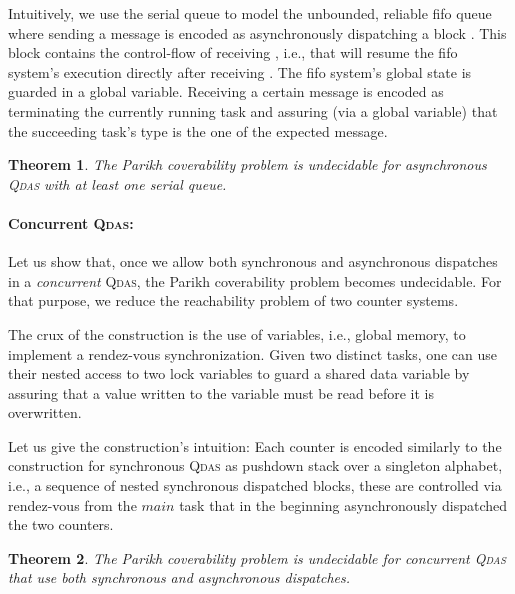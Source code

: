 \documentclass[runningheads,oribibl,]{article}
\newcommand{\main}{\ensuremath{\textit{main}}\xspace}
\newcommand{\qdas}{\textsc{Qdas}\xspace}
\newcommand{\fifo}{fifo\xspace}
\newtheorem{theorem}{Theorem}{}
\begin{document}
Intuitively, we use the serial queue to
model the unbounded, reliable fifo queue where sending a message 
is encoded as asynchronously dispatching a block . This
block  contains the control-flow of
receiving , i.e., that will resume the \fifo system's execution
directly after receiving . The \fifo system's global state is
guarded in a global variable. Receiving a certain message 
is encoded as terminating the currently running task and assuring
(via a global variable) that the succeeding task's type is the one of
the expected message.















\begin{theorem}\label{the:async-seri-undec}
  The Parikh coverability problem is undecidable for asynchronous
  \qdas with at least one serial queue.
\end{theorem}


\paragraph{\bf Concurrent \qdas:}
Let us show that, once we allow both
synchronous and asynchronous dispatches in a \emph{concurrent} \qdas,
the Parikh coverability problem becomes undecidable.
For that purpose, we reduce the reachability problem of two counter
systems.

The crux of the construction is the use of
variables, i.e., global memory, to implement a rendez-vous
synchronization. Given two distinct tasks, one can use their nested
access to two lock variables to guard a shared data variable by
assuring that a value written to the variable must be read before it
is overwritten.

Let us give the construction's intuition: Each counter is
encoded similarly to the construction for synchronous \qdas as
pushdown stack over a singleton alphabet, i.e., a sequence of nested
synchronous dispatched blocks, these are controlled via rendez-vous
 from the \main task that in the beginning
asynchronously dispatched the two counters.







\begin{theorem}\label{thm:concqdasundec}
  The Parikh coverability problem is undecidable for concurrent \qdas that
  use both synchronous and asynchronous dispatches.
\end{theorem}
\end{document}
